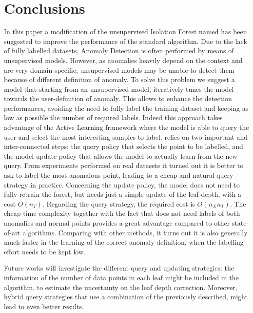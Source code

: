 \section{Conclusions}
\label{conclusions}

In this paper a modification of the unsupervised Isolation Forest named \approach has been suggested to improve the performance of the standard algorithm.
Due to the lack of fully labelled datasets, Anomaly Detection is often performed by means of unsupervised models. However, as anomalies heavily depend on the context and are very domain specific, unsupervised models may be unable to detect them because of different definition of anomaly.
To solve this problem we suggest a model that starting from an unsupervised model, iteratively tunes the model towards the user-definition of anomaly. This allows to enhance the detection performances, avoiding the need to fully label the training dataset and keeping as low as possible the number of required labels. Indeed this approach  takes advantage of the Active Learning framework where the model is able to query the user and select the most interesting samples to label.
\approach relies on two important and inter-connected steps: the query policy that selects the point to be labelled, and the model update policy that allows the model to actually learn from the new query. 
From experiments performed on real datasets  it turned out it is better to ask to label the most anomalous point, leading to a cheap and natural query strategy in practice. Concerning the update policy, the model does not need to fully retrain the forest, but needs just a simple update of the leaf depth, with a cost $O(n_T)$. Regarding the query strategy, the required cost is $O(n_X n_T)$. The cheap time complexity together with the fact that \approach does not need labels of both anomalies and normal points provides a great advantage compared to other state-of-art algorithms.
Comparing \approach with other methods, it turns out it is also generally much faster in the learning of the correct anomaly definition, when the labelling effort needs to be kept low.

Future works will investigate the different query and updating strategies: the information of the number of data points in each leaf might be included in the algorithm, to estimate the uncertainty on the leaf depth correction. Moreover, hybrid query strategies that use a combination of the previously described, might lead to even better results.
